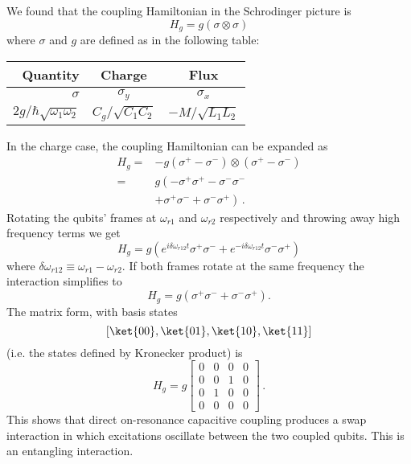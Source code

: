 We found that the coupling Hamiltonian in the Schrodinger picture is
\begin{equation}
  H_g = g \left( \sigma \otimes \sigma \right)
\end{equation}
where $\sigma$ and $g$ are defined as in the following table:
\begin{center}
  \begin{tabular}{r|cc}
    \hline
    \textbf{Quantity} & \textbf{Charge} & \textbf{Flux} \\
    \hline
    $\sigma$ & $\sigma_y$ & $\sigma_x$ \\

    $2g / \hbar \sqrt{\omega_1 \omega_2}$ & $C_g / \sqrt{C_1 C_2}$ & $-M/\sqrt{L_1L_2}$ \\
    \hline
  \end{tabular}
\end{center}
In the charge case, the coupling Hamiltonian can be expanded as
\begin{align*}
  H_g
    =& -g (\sigma^+ - \sigma^-) \otimes (\sigma^+ - \sigma^-) \\
    =& g \left(-\sigma^+ \sigma^+ - \sigma^- \sigma^- \right. \\
     & \left. + \sigma^+ \sigma^- + \sigma^- \sigma^+ \right) \, .
\end{align*}
Rotating the qubits' frames at $\omega_{r1}$ and $\omega_{r2}$ respectively and throwing away high frequency terms we get
\begin{equation}
  H_g = g
  \left(
      e^{ i \delta\omega_{r12} t} \sigma^+ \sigma^-
    + e^{-i \delta\omega_{r12} t} \sigma^- \sigma^+
  \right)
\end{equation}
where $\delta\omega_{r12}\equiv \omega_{r1} - \omega_{r2}$.
If both frames rotate at the same frequency the interaction simplifies to
\begin{equation}
  H_g = g \left( \sigma^+ \sigma^- + \sigma^- \sigma^+ \right).
\end{equation}
The matrix form, with basis states
\begin{equation*}
  \left[ \ket{00}, \ket{01}, \ket{10}, \ket{11} \right]
\end{equation*}
(i.e. the states defined by Kronecker product) is
\begin{equation}
  H_g =
  g \left[ \begin{array}{cccc}
    0 & 0 & 0 & 0 \\
    0 & 0 & 1 & 0 \\
    0 & 1 & 0 & 0 \\
    0 & 0 & 0 & 0
  \end{array} \right] \, .
\end{equation}
This shows that direct on-resonance capacitive coupling produces a swap interaction in which excitations oscillate between the two coupled qubits.
This is an entangling interaction.
